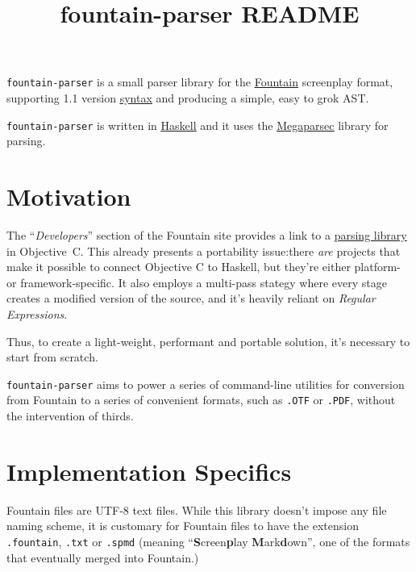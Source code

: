 \documentclass[12pt]{article}
\newcommand{\link}[2]{\underline{\color{darkblue}\href{#1}{#2}}}
\begin{document}
\title{\textbf{fountain-parser README}}
\author{}
\date{}
\maketitle

\texttt{fountain-parser} is a small parser library for the
\link{https://fountain.io/}{Fountain} screenplay format,
supporting 1.1 version
\link{https://fountain.io/syntax/}{syntax} and
producing a simple, easy to grok \textsf{AST}.

\texttt{fountain-parser} is written in
\link{https://haskell.org}{Haskell} and it uses the
\link{https://hackage.haskell.org/package/megaparsec}{Megaparsec}
library for parsing.

\section{Motivation}
The ``\emph{Developers}'' section of the Fountain site provides a
link to a
\link{https://github.com/nyousefi/Fountain}{parsing library}
in \textsf{Objective~C}. This already presents a portability
issue:there \emph{are} projects that make it possible to connect
Objective C to Haskell, but they're either platform- or
framework-specific.  It also employs a multi-pass stategy where
every stage creates a modified version of the source, and it's
heavily reliant on \emph{Regular Expressions}.

Thus, to create a light-weight, performant and portable
solution, it's necessary to start from scratch.

\texttt{fountain-parser} aims to power a series of command-line
utilities for conversion from Fountain to a series of convenient
formats, such as \texttt{.OTF} or \texttt{.PDF}, without the
intervention of thirds.

\section{Implementation Specifics}
Fountain files are \textsf{UTF-8} text files. While this library
doesn't impose any file naming scheme, it is customary for Fountain
files to have the extension \texttt{.fountain}, \texttt{.txt} or
\texttt{.spmd} (meaning
``\textbf{S}creen\textbf{p}lay \textbf{M}ark\textbf{d}own'',
one of the formats that eventually merged into Fountain.)
\end{document}
